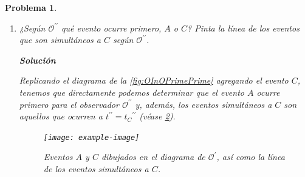 \documentclass[12pt]{article}
\theoremstyle{break}
\newtheorem{exercise}{Problema}
\theoremstyle{nonumberbreak}
\newcommand*{\primeobserver}{\mathcal{O}^{\prime}}
\newcommand*{\biprimeobserver}{\mathcal{O}^{\prime\prime}}
\newcommand*{\inlinesol}{\vspace*{10pt}\textbf{Solución}\vspace*{10pt}}
\begin{document}
\begin{exercise}
\begin{enumerate}[label = \alph*)]
            \begin{figure}[htb]
                \centering
                \texttt{[image: example-image]}
                \caption{Eventos \(A\) y \(C\) dibujados en el diagrama de \(\primeobserver\), así como la línea de los eventos simultáneos a \(C\).}
                \label{fig:ACInOPrime}
            \end{figure}

            \item ¿Según \(\biprimeobserver\) qué evento ocurre primero, \(A\) o \(C\)? Pinta la línea de los eventos que son simultáneos a \(C\) según \(\biprimeobserver\).
            
            \inlinesol

            Replicando el diagrama de la \cref{fig:OInOPrimePrime} agregando el evento \(C\), tenemos que directamente podemos determinar que el evento \(A\) ocurre primero para el observador \(\biprimeobserver\) y, además, los eventos simultáneos a \(C\) son aquellos que ocurren a \(t^{\prime\prime} = {t_{C}}^{\prime\prime}\) (véase \cref{fig:ACInOPrimePrime}).

            \begin{figure}[htb]
                \centering
                \texttt{[image: example-image]}
                \caption{Eventos \(A\) y \(C\) dibujados en el diagrama de \(\primeobserver\), así como la línea de los eventos simultáneos a \(C\).}
                \label{fig:ACInOPrimePrime}
            \end{figure}
        \end{enumerate}
    \end{exercise}
\end{document}

